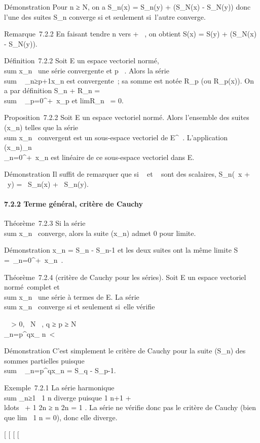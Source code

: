 \documentclass[]{article}
\begin{document}
Démonstration Pour n ≥ N, on a S_n(x) = S_n(y) +
(S_N(x) - S_N(y)) donc l'une des suites S_n
converge si et seulement si~l'autre converge.

Remarque~7.2.2 En faisant tendre n vers + \infty~, on obtient S(x) = S(y) +
(S_N(x) - S_N(y)).

Définition~7.2.2 Soit E un espace vectoriel normé,
\\sum  x_n~ une
série convergente et p \in {}~. Alors la série
\\sum ~
_n≥p+1x_n est convergente~; sa somme est notée
R_p (ou R_p(x)). On a par définition S_n +
R_n = \\sum ~
_p=0^+\infty~x_p et
limR_n~ = 0.

Proposition~7.2.2 Soit E un espace vectoriel normé. Alors l'ensemble des
suites (x_n) telles que la série
\\sum  x_n~
convergent est un sous-espace vectoriel de E^~. L'application
(x_n)_n\in{}~\mapsto~\\\sum
 _n=0^+\infty~x_n est linéaire de ce sous-espace
vectoriel dans E.

Démonstration Il suffit de remarquer que si \alpha~ et \beta~ sont des scalaires,
S_n(\alpha~x + \beta~y) = \alpha~S_n(x) + \beta~S_n(y).

\paragraph{7.2.2 Terme général, critère de Cauchy}

Théorème~7.2.3 Si la série
\\sum  x_n~
converge, alors la suite (x_n) admet 0 pour limite.

Démonstration x_n = S_n - S_n-1 et les deux
suites ont la même limite S =\
\sum  _n=0^+\infty~x_n~.

Théorème~7.2.4 (critère de Cauchy pour les séries). Soit E un espace
vectoriel normé~complet et
\\sum  x_n~ une
série à termes de E. La série
\\sum  x_n~
converge si et seulement si~elle vérifie

\forall~~\epsilon \textgreater{} 0,
\exists~N \in {}~, q ≥ p ≥ N
\rigtharrow~\\\sum
_n=p^qx_ n\
\textless{} \epsilon

Démonstration C'est simplement le critère de Cauchy pour la suite
(S_n) des sommes partielles puisque
\\sum ~
_n=p^qx_n = S_q - S_p-1.

Exemple~7.2.1 La série harmonique
\\sum  _n≥1~ 1
\over n diverge puisque  1 \over n+1
+ \\ldots~ + 1
n ≥ n  \over 2n = 1
\over 2 . La série ne vérifie donc pas le critère de
Cauchy (bien que lim~ 1 \over
n = 0), donc elle diverge.

{[}
{[}
{[}
{[}
\end{document}
